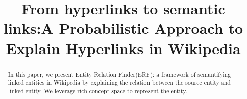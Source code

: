 \documentclass[letterpaper]{article}
\begin{document}
\title{From hyperlinks to semantic links:A Probabilistic Approach to Explain Hyperlinks in Wikipedia}




\maketitle
\begin{abstract}
In this paper, we present Entity Relation Finder(ERF): a framework of semantifying linked entities in Wikipedia by explaining the relation between the source entity and linked entity. We leverage rich concept space to represent the entity.

\end{abstract}












\end{document}
